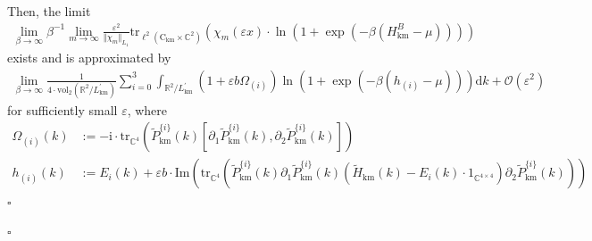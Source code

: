 \begin{exa}
\begin{con}
Then, the limit
\begin{align*}
  \lim_{\beta \to \infty}
  \beta^{-1}
  \lim_{m\to\infty}
  \frac{\varepsilon^{2}}{\Vert \chi_{m} \Vert_{L_{1}}}
  \mathrm{tr}_{\ell^{2}(\mathrm{C}_{\textrm{km}} \times \mathbb{C}^{2})}
  \left(
    \chi_{m}(\varepsilon x)
    \cdot
    \ln
    \left(
      1
      +
      \exp
      \left(
        -
        \beta
        \left(
          H_{\textrm{km}}^{B}
          -
          \mu
        \right)
      \right)
    \right)
  \right)
\end{align*}
exists and is approximated by
\begin{align*}
  \lim_{\beta \to \infty}
  \frac{1}{4 \cdot \mathrm{vol}_{2}(\mathbb{R}^{2}/L_{\textrm{km}}^{\prime})}
  \sum_{i=0}^{3}
  \int_{\mathbb{R}^{2}/L_{\textrm{km}}^{\prime}}
  \left(
    1
    +
    \varepsilon
    b
    \Omega_{(i)}
  \right)
  \ln
  \left(
    1
    +
    \exp
    \left(
      -
      \beta
      \left(
        h_{(i)}
        -
        \mu
      \right)
    \right)
  \right)
  \mathrm{d}k
  +
  \mathcal{O}(\varepsilon^{2})
\end{align*}
for sufficiently small $\varepsilon$, where
\begin{align*}
  \Omega_{(i)}(k)
  &:=
  -
  \mathrm{i}
  \cdot
  \mathrm{tr}_{\mathbb{C}^{4}}
  \left(
    \tilde{P}_{\textrm{km}}^{\lbrace i \rbrace}(k)
    \left[
      \partial_{1}
      \tilde{P}_{\textrm{km}}^{\lbrace i \rbrace}(k),
      \partial_{2}
      \tilde{P}_{\textrm{km}}^{\lbrace i \rbrace}(k)
    \right]
  \right)
  \\
  h_{(i)}(k)
  &:=
  E_{i}(k)
  +
  \varepsilon
  b
  \cdot
  \mathrm{Im}
  \left(
    \mathrm{tr}_{\mathbb{C}^{4}}
    \left(
      \tilde{P}_{\textrm{km}}^{\lbrace i \rbrace}(k)
      \partial_{1}
      \tilde{P}_{\textrm{km}}^{\lbrace i \rbrace}(k)
      \left(
        \tilde{H}_{\textrm{km}}(k)
        -
        E_{i}(k)
        \cdot
        1_{\mathbb{C}^{4 \times 4}}
      \right)
      \partial_{2}
      \tilde{P}_{\textrm{km}}^{\lbrace i \rbrace}(k)
    \right)
  \right)
\end{align*}
\phantom{proven}
\hfill
$\square$
\end{con}
\phantom{proven}
\hfill
$\square$
\end{exa}
